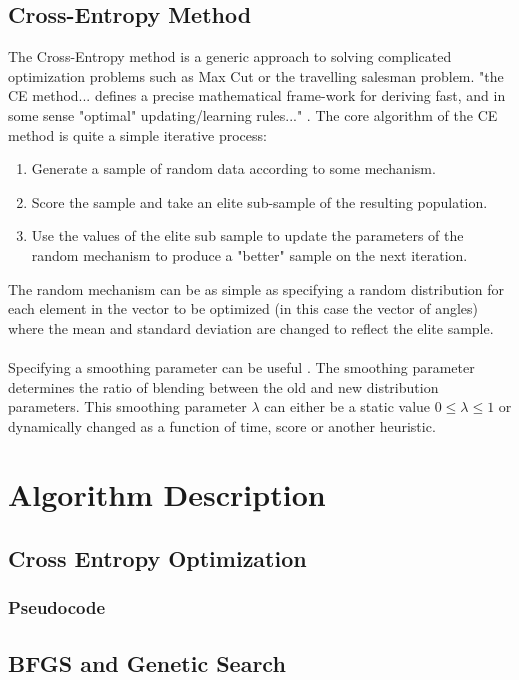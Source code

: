 \documentclass[conference,letterpaper]{IEEEtran}
\begin{document}
\subsection{Cross-Entropy Method}
The Cross-Entropy method is a generic approach to solving complicated optimization problems such as Max Cut or the travelling salesman problem. "the CE method... defines a precise mathematical frame-work for deriving fast, and in some sense "optimal" updating/learning rules..." \cite{CE}. The core algorithm of the CE method is quite a simple iterative process:
\begin{enumerate}
    \item Generate a sample of random data according to some mechanism.
    \item Score the sample and take an elite sub-sample of the resulting population.
    \item Use the values of the elite sub sample to update the parameters of the random mechanism to produce a "better" sample on the next iteration.
\end{enumerate}
The random mechanism can be as simple as specifying a random distribution for each element in the vector to be optimized (in this case the vector of angles) where the mean and standard deviation are changed to reflect the elite sample.
\\\\
Specifying a smoothing parameter can be useful \cite{CE2}. The smoothing parameter determines the ratio of blending between the old and new distribution parameters. This smoothing parameter $\lambda$ can either be a static value $0 \leq \lambda \leq 1$ or dynamically changed as a function of time, score or another heuristic.

\newpage
\section{Algorithm Description}
\subsection{Cross Entropy Optimization}
\subsubsection{Pseudocode}


\newpage
\subsection{BFGS and Genetic Search}
\end{document}
